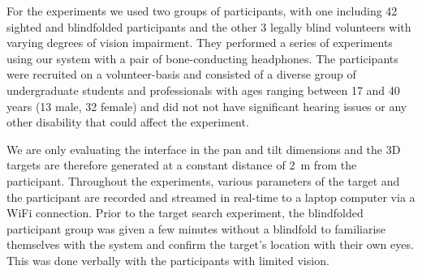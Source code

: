 \documentclass[sigconf, review=true, screen=true, anonymous=true]{acmart}
\begin{document}
For the experiments we used two groups of participants, with one including 42 sighted and blindfolded participants and the other 3 legally blind volunteers with varying degrees of vision impairment. 
They performed a series of experiments using our system with a pair of bone-conducting headphones.
The participants were recruited on a volunteer-basis and consisted of a diverse group of undergraduate students and professionals with ages ranging between 17 and 40 years (13 male, 32 female) and did not not have significant hearing issues or any other disability that could affect the experiment.



We are only evaluating the interface in the pan and tilt dimensions and the 3D targets are therefore generated at a constant distance of \SI{2}{\metre} from the participant.
Throughout the experiments, various parameters of the target and the participant are recorded and streamed in real-time to a laptop computer via a WiFi connection.
Prior to the target search experiment, the blindfolded participant group was given a few minutes without a blindfold to familiarise themselves with the system and confirm the target's location with their own eyes.
This was done verbally with the participants with limited vision. 

\end{document}
